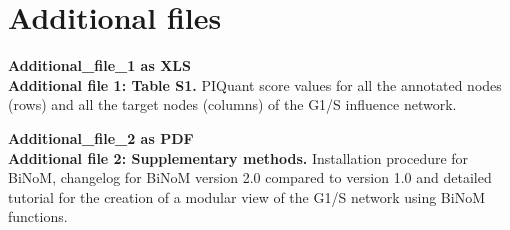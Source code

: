 \documentclass[11pt]{bmc_article_s50}
\begin{document}
\section*{Additional files}




\textbf{Additional\_file\_1 as XLS}\\
\textbf{Additional file 1: Table S1.}
PIQuant score values for all the annotated nodes (rows) and all the target nodes (columns) of the G1/S influence network.

\textbf{Additional\_file\_2 as PDF}\\
\textbf{Additional file 2: Supplementary methods.}
Installation procedure for BiNoM, changelog for BiNoM version 2.0 compared to version 1.0 and detailed tutorial for the creation of a modular view of the G1/S network using BiNoM functions.
\end{document}
